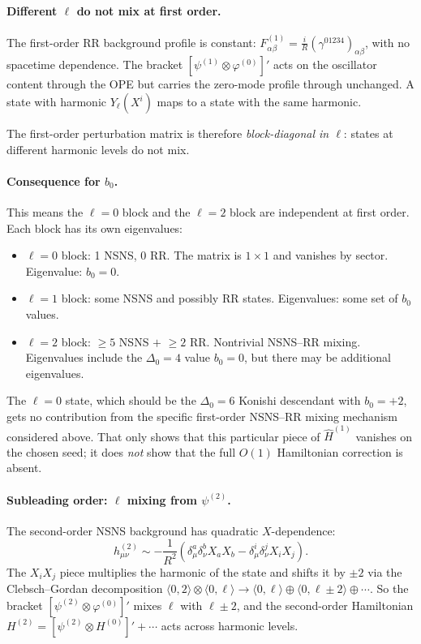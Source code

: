 \documentclass[12pt]{article}
\def\be{\begin{equation}}
\def\ee{\end{equation}}
\newcommand{\D}{\ensuremath{\Delta}}
\begin{document}
\paragraph{Different $\ell$ do not mix at first order.}
The first-order RR background profile is constant:
$F^{(1)}_{\alpha\beta}=\frac{i}{R}(\gamma^{01234})_{\alpha\beta}$,
with no spacetime dependence. The bracket $[\psi^{(1)}\otimes\varphi^{(0)}]'$ acts on
the oscillator content through the OPE but carries the zero-mode profile through unchanged.
A state with harmonic $Y_\ell(X^i)$ maps to a state with the same harmonic.

The first-order perturbation matrix is therefore \emph{block-diagonal in $\ell$}:
states at different harmonic levels do not mix.

\paragraph{Consequence for $b_0$.}
This means the $\ell=0$ block and the $\ell=2$ block are independent at first order.
Each block has its own eigenvalues:
\begin{itemize}
\item $\ell=0$ block: 1 NSNS, 0 RR. The matrix is $1\times 1$ and vanishes by sector.
Eigenvalue: $b_0=0$.
\item $\ell=1$ block: some NSNS and possibly RR states. Eigenvalues: some set of $b_0$ values.
\item $\ell=2$ block: $\geq 5$ NSNS $+$ $\geq 2$ RR. Nontrivial NSNS--RR mixing. Eigenvalues
include the $\D_0=4$ value $b_0=0$, but there may be additional eigenvalues.
\end{itemize}

The $\ell=0$ state, which should be the $\D_0=6$ Konishi descendant with $b_0=+2$, gets
no contribution from the specific first-order NSNS--RR mixing mechanism considered above.
That only shows that this particular piece of $\widehat H^{(1)}$ vanishes on the chosen seed;
it does \emph{not} show that the full $O(1)$ Hamiltonian correction is absent.

\paragraph{Subleading order: $\ell$ mixing from $\psi^{(2)}$.}
The second-order NSNS background has quadratic $X$-dependence:
\be
h^{(2)}_{\mu\nu}\sim -\frac{1}{R^2}(\delta^a_\mu\delta^b_\nu X_aX_b
-\delta^i_\mu\delta^j_\nu X_iX_j).
\ee
The $X_iX_j$ piece multiplies the harmonic of the state and shifts it by $\pm 2$ via the
Clebsch--Gordan decomposition $\langle 0,2\rangle\otimes\langle 0,\ell\rangle
\to\langle 0,\ell\rangle\oplus\langle 0,\ell\pm 2\rangle\oplus\cdots$.
So the bracket $[\psi^{(2)}\otimes\varphi^{(0)}]'$ mixes $\ell$ with $\ell\pm 2$, and the
second-order Hamiltonian $H^{(2)}=[\psi^{(2)}\otimes H^{(0)}]'+\cdots$ acts across harmonic levels.
\end{document}
